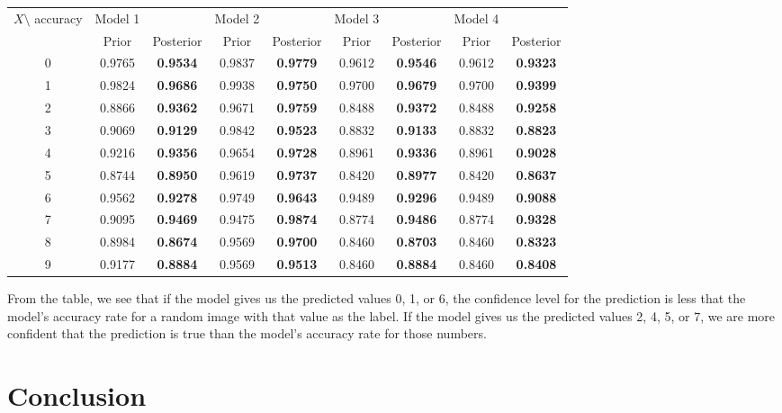 \documentclass[11pt]{amsart}
\begin{document}
\begin{center}
\bgroup
\def\arraystretch{1.2}
\begin{tabular}{c|cc|cc|cc|cc}
\hline
$X\setminus$ accuracy & Model 1 &       & Model 2 &       & Model 3 &       & Model 4 &    \\
                      & Prior  & Posterior & Prior  & Posterior & Prior  & Posterior & Prior  & Posterior \\
\hline
0 & 0.9765 & {\bf 0.9534} & 0.9837 & {\bf 0.9779} & 0.9612 & {\bf 0.9546} & 0.9612 & {\bf 0.9323}\\
\hline
1 & 0.9824 & {\bf 0.9686} & 0.9938 & {\bf 0.9750} & 0.9700 & {\bf 0.9679} & 0.9700 &  {\bf 0.9399}\\
\hline
2 & 0.8866 & {\bf 0.9362} & 0.9671 & {\bf 0.9759} & 0.8488 & {\bf 0.9372} & 0.8488 &  {\bf 0.9258}\\
\hline
3 & 0.9069 & {\bf 0.9129} & 0.9842 & {\bf 0.9523} & 0.8832 & {\bf 0.9133} & 0.8832 &  {\bf 0.8823}\\
\hline
4 & 0.9216 & {\bf 0.9356} & 0.9654 & {\bf 0.9728} & 0.8961 & {\bf 0.9336} & 0.8961 &  {\bf 0.9028}\\
\hline
5 & 0.8744 & {\bf 0.8950} & 0.9619 & {\bf 0.9737} & 0.8420 & {\bf 0.8977} & 0.8420 &  {\bf 0.8637}\\
\hline
6 & 0.9562 & {\bf 0.9278} & 0.9749 & {\bf 0.9643} & 0.9489 & {\bf 0.9296} & 0.9489 &  {\bf 0.9088}\\
\hline
7 & 0.9095 & {\bf 0.9469} & 0.9475 & {\bf 0.9874} & 0.8774 & {\bf 0.9486} & 0.8774 &  {\bf 0.9328}\\
\hline
8 & 0.8984 & {\bf 0.8674} & 0.9569 & {\bf 0.9700} & 0.8460 & {\bf 0.8703} & 0.8460 &  {\bf 0.8323}\\
\hline
9 & 0.9177 & {\bf 0.8884} & 0.9569 & {\bf 0.9513} & 0.8460 & {\bf 0.8884} & 0.8460 &  {\bf 0.8408}\\
\hline
\end{tabular}
\egroup
\end{center}
\bigskip

From the table, we see that if the model gives us the predicted values 0, 1, or 6, the confidence level for the prediction is less that the model's accuracy rate for a random image with that value as the label. If the model gives us the predicted values 2, 4, 5, or 7, we are more confident that the prediction is true than the model's accuracy rate for those numbers.


\section{Conclusion}
\end{document}
